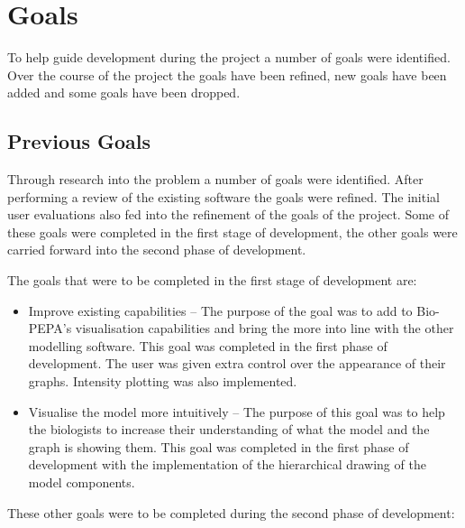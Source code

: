 \chapter{Goals}

To help guide development during the project a number of goals were identified.  Over the course of the project the goals have been refined, new goals have been added and some goals have been dropped.

\section{Previous Goals}
Through research into the problem a number of goals were identified.  After performing a review of the existing software the goals were refined.  The initial user evaluations also fed into the refinement of the goals of the project.  Some of these goals were completed in the first stage of development, the other goals were carried forward into the second phase of development.

The goals that were to be completed in the first stage of development are:

\begin{itemize}
\item Improve existing capabilities -- The purpose of the goal was to add to Bio-PEPA's visualisation capabilities and bring the more into line with the other modelling software.  This goal was completed in the first phase of development. The user was given extra control over the appearance of their graphs.  Intensity plotting was also implemented.
\item Visualise the model more intuitively -- The purpose of this goal was to help the biologists to increase their understanding of what the model and the graph is showing them.  This goal was completed in the first phase of development with the implementation of the hierarchical drawing of the model components.
\end{itemize}

These other goals were to be completed during the second phase of development:

